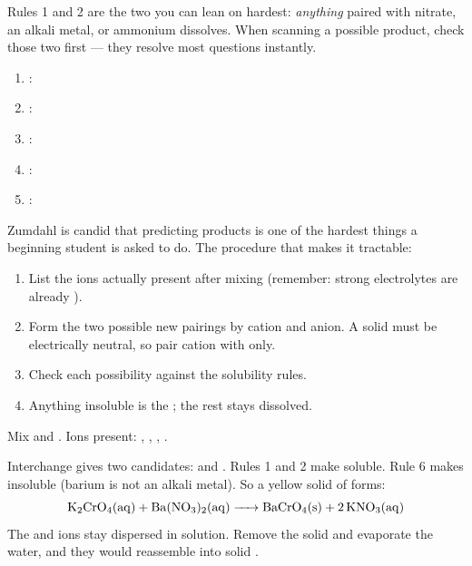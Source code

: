 \documentclass{apchem-notes}
\begin{document}
\begin{apcnote}
Rules 1 and 2 are the two you can lean on hardest: \emph{anything} paired
with nitrate, an alkali metal, or ammonium dissolves. When scanning a
possible product, check those two first --- they resolve most questions
instantly.
\end{apcnote}


\begin{enumerate}[leftmargin=*,itemsep=0.3em]
  \item {}: 
  \item {}: 
  \item {}: 
  \item {}: 
  \item {}: 
\end{enumerate}



Zumdahl is candid that predicting products is one of the hardest things a
beginning student is asked to do. The procedure that makes it tractable:

\begin{enumerate}[leftmargin=*,itemsep=0.2em]
  \item List the ions actually present after mixing (remember: strong
        electrolytes are already ).
  \item Form the two possible new pairings by
         cation and anion. A solid must be
        electrically neutral, so pair cation with
         only.
  \item Check each possibility against the solubility rules.
  \item Anything insoluble is the ; the rest stays
        dissolved.
\end{enumerate}

\begin{workedexample}
Mix  and . Ions present:
, , , .

Interchange gives two candidates:  and .
Rules 1 and 2 make  soluble. Rule 6 makes  insoluble
(barium is not an alkali metal). So a yellow solid of  forms:
\[ \ce{K2CrO4(aq) + Ba(NO3)2(aq) -> BaCrO4(s) + 2 KNO3(aq)} \]
The  and  ions stay dispersed in solution. Remove the solid
and evaporate the water, and they would reassemble into solid .
\end{workedexample}
\end{document}
